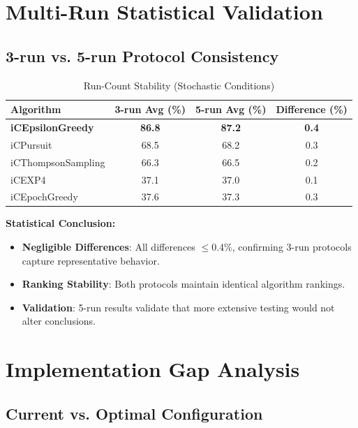 \documentclass[12pt,a4paper]{article}
\newcommand{\success}[1]{\textcolor{accentgreen}{\textbf{#1}}}
\begin{document}
\section{Multi-Run Statistical Validation}

\subsection{3-run vs. 5-run Protocol Consistency}

\begin{table}[H]
\centering
\caption{Run-Count Stability (Stochastic Conditions)}
\label{tab:run-count}
\begin{tabular}{@{}lccc@{}}
\toprule
\textbf{Algorithm} & \textbf{3-run Avg (\%)} & \textbf{5-run Avg (\%)} & \textbf{Difference (\%)} \\
\midrule
\success{iCEpsilonGreedy}   & \success{86.8} & \success{87.2} & \success{0.4} \\
iCPursuit                   & 68.5 & 68.2 & 0.3 \\
iCThompsonSampling          & 66.3 & 66.5 & 0.2 \\
iCEXP4                      & 37.1 & 37.0 & 0.1 \\
iCEpochGreedy               & 37.6 & 37.3 & 0.3 \\
\bottomrule
\end{tabular}
\end{table}

\textbf{Statistical Conclusion:}
\begin{itemize}
\item \success{Negligible Differences}: All differences $\leq$0.4\%, confirming 3-run protocols capture representative behavior.
\item \success{Ranking Stability}: Both protocols maintain identical algorithm rankings.
\item \success{Validation}: 5-run results validate that more extensive testing would not alter conclusions.
\end{itemize}

\section{Implementation Gap Analysis}

\subsection{Current vs. Optimal Configuration}
\end{document}
